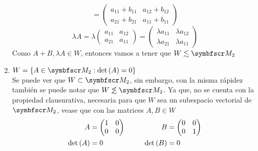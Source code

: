 \begin{enumerate}[label=\listAlph]
\[                =
                \begin{pmatrix}
                    a_{11} + b_{11} & a_{12} + b_{12} \\
                    a_{21} + b_{21} & a_{11} + b_{11}
                \end{pmatrix}
            \]
            \[
                \lambda A =
                \lambda
                \begin{pmatrix}
                    a_{11} & a_{12} \\
                    a_{21} & a_{11}
                \end{pmatrix}
                =
                \begin{pmatrix}
                    \lambda a_{11} & \lambda a_{12} \\
                    \lambda a_{21} & \lambda a_{11}
                \end{pmatrix}
            \]
            Como \(A + B, \lambda A \in W\), entonces vamos a tener que \(W \lesssim \fm_2\)
        \item \(W = \left\{ A \in \fm_2 : \pdet{A} = 0 \right\}\) \\
            Se puede ver que \(W \subset \fm_2\), sin embargo, con la misma rápidez también se puede notar que \(W \not\lesssim \fm_2\).
            Ya que, no se cuenta con la propiedad clausurativa, necesaria para que \(W\) sea un subespacio vectorial de \(\fm_2\), vease que
            con las matrices \(A, B \in W\)
            \[
                \begin{aligned}
                    A &= 
                    \begin{pmatrix}
                        1 & 0 \\
                        0 & 0
                    \end{pmatrix}
                    \\
                    \text{det} \left( A \right) &= 0
                \end{aligned}
                \hspace{1cm}
                \begin{aligned}
                    B &= 
                    \begin{pmatrix}
                        0 & 0 \\
                        0 & 1
                    \end{pmatrix}
                    \\
                    \text{det} \left( B \right) &= 0
                \end{aligned}
\]
\end{enumerate}
